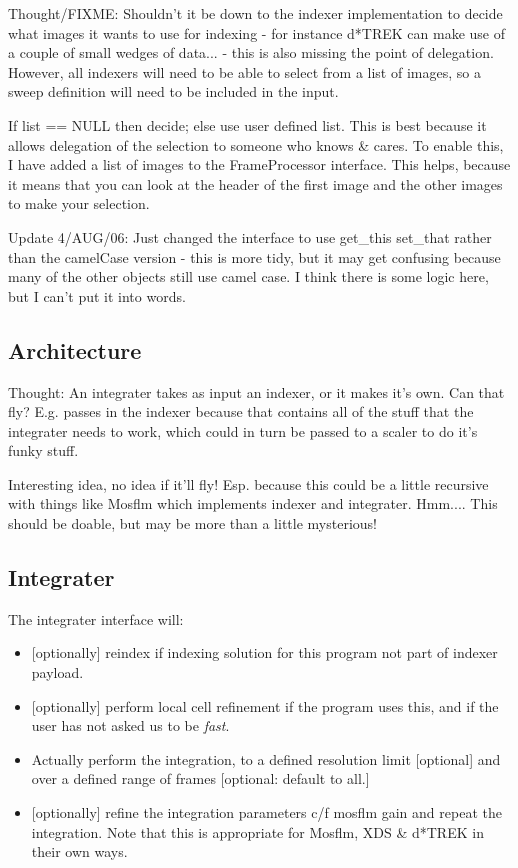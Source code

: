 \documentclass[a4paper, 11pt]{article}
\begin{document}
Thought/FIXME: Shouldn't it be down to the indexer implementation to decide
what images it wants to use for indexing - for instance d*TREK can make
use of a couple of small wedges of data... - this is also missing the point
of delegation. However, all indexers will need to be able to select from a 
list of images, so a sweep definition will need to be included in the input.

If list == NULL then decide; else use user defined list. This is best because
it allows delegation of the selection to someone who knows \& cares. 
To enable this, I have added a list of images to the FrameProcessor
interface. This helps, because it means that you can look at the header of
the first image and the other images to make your selection.

Update 4/AUG/06: Just changed the interface to use get\_this set\_that
rather than the camelCase version - this is more tidy, but it may get 
confusing because many of the other objects still use camel case. I think
there is some logic here, but I can't put it into words.

\subsection{Architecture}

Thought: An integrater takes as input an indexer, or it makes it's own.
Can that fly? E.g. passes in the indexer because that contains all of the
stuff that the integrater needs to work, which could in turn be passed
to a scaler to do it's funky stuff.

Interesting idea, no idea if it'll fly! Esp. because this could be a little
recursive with things like Mosflm which implements indexer and integrater.
Hmm.... This should be doable, but may be more than a little mysterious!

\subsection{Integrater}

The integrater interface will:

\begin{itemize}
\item{[optionally] reindex if indexing solution for this program not part
of indexer payload.}
\item{[optionally] perform local cell refinement if the program uses this, 
and if the user has not asked us to be \emph{fast}.}
\item{Actually perform the integration, to a defined resolution limit 
[optional] and over a defined range of frames [optional: default to all.]}
\item{[optionally] refine the integration parameters c/f mosflm gain 
and repeat the integration. Note that this is appropriate for Mosflm,
XDS \& d*TREK in their own ways.}
\end{itemize}
\end{document}
